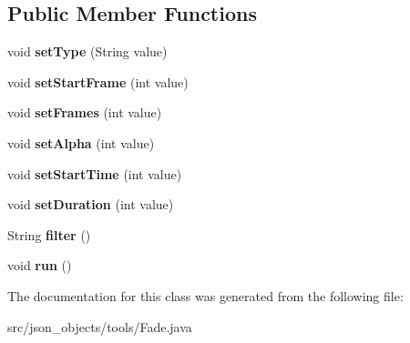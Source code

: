 \subsection*{Public Member Functions}
\begin{DoxyCompactItemize}
\item 
\hypertarget{classjson__objects_1_1tools_1_1_fade_acab58e3a95d3775c8362a2b3683c369e}{
void {\bfseries setType} (String value)}
\label{classjson__objects_1_1tools_1_1_fade_acab58e3a95d3775c8362a2b3683c369e}

\item 
\hypertarget{classjson__objects_1_1tools_1_1_fade_ae75e52cca54df933e19ee7688f5b53d4}{
void {\bfseries setStartFrame} (int value)}
\label{classjson__objects_1_1tools_1_1_fade_ae75e52cca54df933e19ee7688f5b53d4}

\item 
\hypertarget{classjson__objects_1_1tools_1_1_fade_affafcfc91d2b8e75c4197d48feaff492}{
void {\bfseries setFrames} (int value)}
\label{classjson__objects_1_1tools_1_1_fade_affafcfc91d2b8e75c4197d48feaff492}

\item 
\hypertarget{classjson__objects_1_1tools_1_1_fade_a2b5bffec7ddfbe928686eb17408d9448}{
void {\bfseries setAlpha} (int value)}
\label{classjson__objects_1_1tools_1_1_fade_a2b5bffec7ddfbe928686eb17408d9448}

\item 
\hypertarget{classjson__objects_1_1tools_1_1_fade_ae6342ee2dd28413c70146ed2760f63c1}{
void {\bfseries setStartTime} (int value)}
\label{classjson__objects_1_1tools_1_1_fade_ae6342ee2dd28413c70146ed2760f63c1}

\item 
\hypertarget{classjson__objects_1_1tools_1_1_fade_a83010ae90814955eaa1d920576b5cb5b}{
void {\bfseries setDuration} (int value)}
\label{classjson__objects_1_1tools_1_1_fade_a83010ae90814955eaa1d920576b5cb5b}

\item 
\hypertarget{classjson__objects_1_1tools_1_1_fade_a626826448cfb18627f4d0a5a6037cc62}{
String {\bfseries filter} ()}
\label{classjson__objects_1_1tools_1_1_fade_a626826448cfb18627f4d0a5a6037cc62}

\item 
\hypertarget{classjson__objects_1_1tools_1_1_fade_a9cf0854c77e5ba030d2522f4d85d4a6a}{
void {\bfseries run} ()}
\label{classjson__objects_1_1tools_1_1_fade_a9cf0854c77e5ba030d2522f4d85d4a6a}

\end{DoxyCompactItemize}


The documentation for this class was generated from the following file:\begin{DoxyCompactItemize}
\item 
src/json\_\-objects/tools/Fade.java\end{DoxyCompactItemize}
